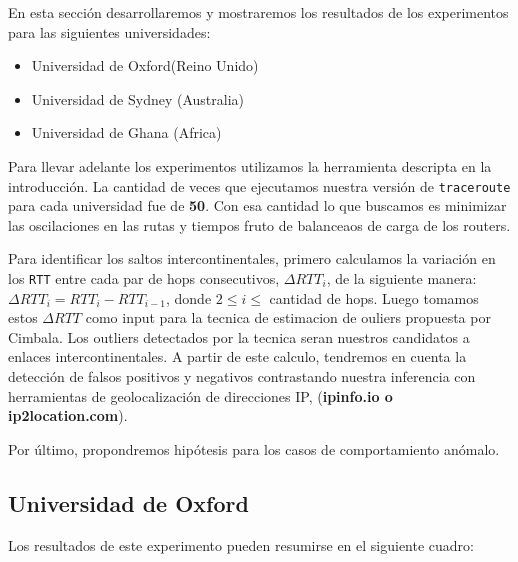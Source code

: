 En esta sección desarrollaremos y mostraremos los resultados de los experimentos para las siguientes
universidades:

\begin{itemize}
\item Universidad de Oxford(Reino Unido)
\item Universidad de Sydney (Australia)
\item Universidad de Ghana (Africa)
\end{itemize}

Para llevar adelante los experimentos utilizamos la herramienta descripta en la introducción. La cantidad de veces que ejecutamos nuestra versión de \texttt{traceroute} para cada universidad fue de \textbf{50}. Con esa cantidad lo que buscamos  es minimizar las oscilaciones en las rutas y tiempos fruto de balanceaos de carga de los routers.

Para identificar los saltos intercontinentales, primero calculamos la variación en los \texttt{RTT} entre cada par de hops consecutivos, $\Delta RTT_{i}$, de la siguiente manera: \(\Delta RTT_{i} = RTT_{i} - RTT_{i-1}\), donde $2 \leq i \leq$ cantidad de hops. Luego tomamos estos $\Delta RTT$ como input para la tecnica de estimacion de ouliers propuesta por Cimbala. Los outliers detectados por la tecnica seran nuestros candidatos a enlaces intercontinentales.
A partir de este calculo, tendremos en cuenta la detección de falsos positivos y negativos contrastando nuestra inferencia con herramientas de geolocalización de direcciones IP, (\textbf{ipinfo.io o ip2location.com}).

Por último, propondremos hipótesis para los casos de comportamiento anómalo.

\subsection{Universidad de Oxford}

Los resultados de este experimento pueden resumirse en el siguiente cuadro:


